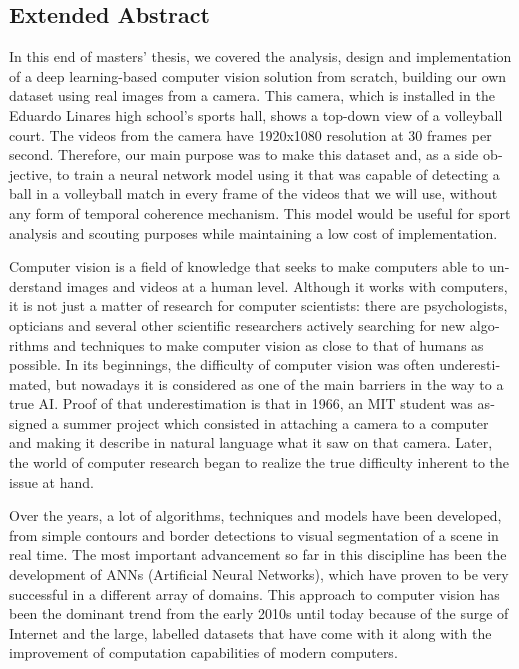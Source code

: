 \newpage

\begin{otherlanguage}{english}
    
\section*{Extended Abstract}

In this end of masters’ thesis, we covered the analysis, design and implementation of a deep learning-based computer vision solution from scratch, building our own dataset using real images from a camera. This camera, which is installed in the Eduardo Linares high school’s sports hall, shows a top-down view of a volleyball court. The videos from the camera have 1920x1080 resolution at 30 frames per second.
Therefore, our main purpose was to make this dataset and, as a side objective, to train a neural network model using it that was capable of detecting a ball in a volleyball match in every frame of the videos that we will use, without any form of temporal coherence mechanism. This model would be useful for sport analysis and scouting purposes while maintaining a low cost of implementation.

Computer vision is a field of knowledge that seeks to make computers able to understand images and videos at a human level. Although it works with computers, it is not just a matter of research for computer scientists: there are psychologists, opticians and several other scientific researchers actively searching for new algorithms and techniques to make computer vision as close to that of humans as possible. In its beginnings, the difficulty of computer vision was often underestimated, but nowadays it is considered as one of the main barriers in the way to a true AI. Proof of that underestimation is that in 1966, an MIT student was assigned a summer project which consisted in attaching a camera to a computer and making it describe in natural language what it saw on that camera. Later, the world of computer research began to realize the true difficulty inherent to the issue at hand.

Over the years, a lot of algorithms, techniques and models have been developed, from simple contours and border detections to visual segmentation of a scene in real time. The most important advancement so far in this discipline has been the development of ANNs (Artificial Neural Networks), which have proven to be very successful in a different array of domains. This approach to computer vision has been the dominant trend from the early 2010s until today because of the surge of Internet and the large, labelled datasets that have come with it along with the improvement of computation capabilities of modern computers.


\end{otherlanguage}
